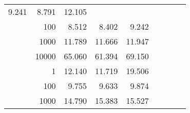 \begin{table}
\begin{tabular}{rrrrrrrrr}
						
							    
							    
	                           9.241 & 8.791 & 12.105  \\
	                
	            
					 &  
					 
					\multirow{ 1 }{*}{ 100 } &
					
						
							    
							    
	                           8.512 & 8.402 & 9.242  \\
	                
	            
					 &  
					 
					\multirow{ 1 }{*}{ 1000 } &
					
						
							    
							    
	                           11.789 & 11.666 & 11.947  \\
	                
	            
					 &  
					 
					\multirow{ 1 }{*}{ 10000 } &
					
						
							    
							    
	                           65.060 & 61.394 & 69.150  \\
	                
	            
	        
				\noalign{\smallskip}\hline
				\multirow{ 4 }{*}{ 1000000 } &
				
					
					 
					\multirow{ 1 }{*}{ 1 } &
					
						
							    
							    
	                           12.140 & 11.719 & 19.506  \\
	                
	            
					 &  
					 
					\multirow{ 1 }{*}{ 100 } &
					
						
							    
							    
	                           9.755 & 9.633 & 9.874  \\
	                
	            
					 &  
					 
					\multirow{ 1 }{*}{ 1000 } &
					
						
							    
							    
	                           14.790 & 15.383 & 15.527  \\
	                

\end{tabular}
\end{table}
